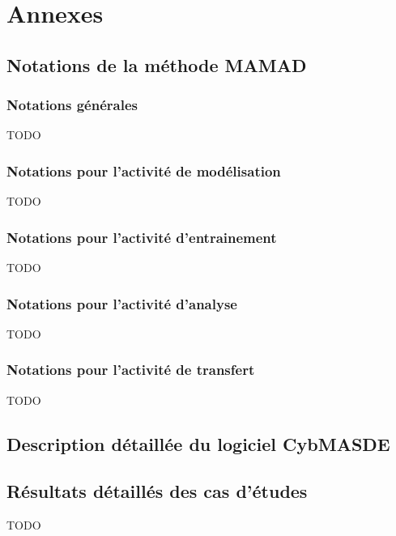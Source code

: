 \clearpage
\thispagestyle{empty}
\null
\newpage

\cleardoublepage
{}
\part{Annexes}
\label{part:annexes}

\clearpage
\thispagestyle{empty}
\null
\newpage

\chapter{Notations de la méthode MAMAD}

\section{Notations générales}
TODO

\section{Notations pour l'activité de modélisation}
TODO

\section{Notations pour l'activité d'entrainement}
TODO

\section{Notations pour l'activité d'analyse}
TODO

\section{Notations pour l'activité de transfert}
TODO

\clearpage
\thispagestyle{empty}
\null
\newpage

\chapter{Description détaillée du logiciel CybMASDE}

\clearpage
\thispagestyle{empty}
\null
\newpage

\chapter{Résultats détaillés des cas d'études}

TODO
